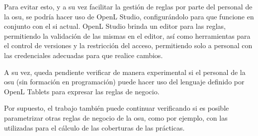 Para evitar esto, y a su vez facilitar la gestión de reglas por parte del personal de la {osu}, se podría hacer uso de OpenL Studio, configurándolo para que funcione en conjunto con el \acrshort{si} actual. 
OpenL Studio brinda un editor para las reglas, permitiendo la validación de las mismas en el editor, así como herramientas para el control de versiones y la restricción del acceso, permitiendo solo a personal con las credenciales adecuadas para que realice cambios.

A su vez, queda pendiente verificar de manera experimental si el personal de la \acrshort{osu} (sin formación en programación) puede hacer uso del lenguaje definido por OpenL Tablets para expresar las reglas de negocio. 

Por supuesto, el trabajo también puede continuar verificando si es posible parametrizar otras reglas de negocio de la \acrshort{osu}, como por ejemplo, con las utilizadas para el cálculo de las coberturas de las prácticas.

